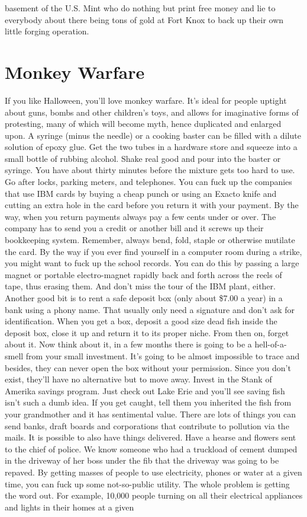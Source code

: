 \documentclass[11pt,twoside,a4paper]{book}
\begin{document}
basement of the U.S. Mint who do nothing but print free money and lie to everybody about there being tons of gold at Fort Knox to back up their own little forging operation.~\\

\section{Monkey Warfare}

If you like Halloween, you'll love monkey warfare. It's ideal for people uptight about guns, bombs and other children's toys, and allows for imaginative forms of protesting, many of which will become myth, hence duplicated and enlarged upon. A syringe (minus the needle) or a cooking baster can be filled with a dilute solution of epoxy glue. Get the two tubes in a hardware store and squeeze into a small bottle of rubbing alcohol. Shake real good and pour into the baster or syringe. You have about thirty minutes before the mixture gets too hard to use. Go after locks, parking meters, and telephones. You can fuck up the companies that use IBM cards by buying a cheap punch or using an Exacto knife and cutting an extra hole in the card before you return it with your payment. By the way, when you return payments always pay a few cents under or over. The company has to send you a credit or another bill and it screws up their bookkeeping system. Remember, always bend, fold, staple or otherwise mutilate the card. By the way if you ever find yourself in a computer room during a strike, you might want to fuck up the school records. You can do this by passing a large magnet or portable electro-magnet rapidly back and forth across the reels of tape, thus erasing them. And don't miss the tour of the IBM plant, either. Another good bit is to rent a safe deposit box (only about \$7.00 a year) in a bank using a phony name. That usually only need a signature and don't ask for identification. When you get a box, deposit a good size dead fish inside the deposit box, close it up and return it to its proper niche. From then on, forget about it. Now think about it, in a few months there is going to be a hell-of-a-smell from your small investment. It's going to be almost impossible to trace and besides, they can never open the box without your permission. Since you don't exist, they'll have no alternative but to move away. Invest in the Stank of Amerika savings program. Just check out Lake Erie and you'll see saving fish isn't such a dumb idea. If you get caught, tell them you inherited the fish from your grandmother and it has sentimental value. There are lots of things you can send banks, draft boards and corporations that contribute to pollution via the mails. It is possible to also have things delivered. Have a hearse and flowers sent to the chief of police. We know someone who had a truckload of cement dumped in the driveway of her boss under the fib that the driveway was going to be repaved. By getting masses of people to use electricity, phones or water at a given time, you can fuck up some not-so-public utility. The whole problem is getting the word out. For example, 10,000 people turning on all their electrical appliances and lights in their homes at a given 
\end{document}
